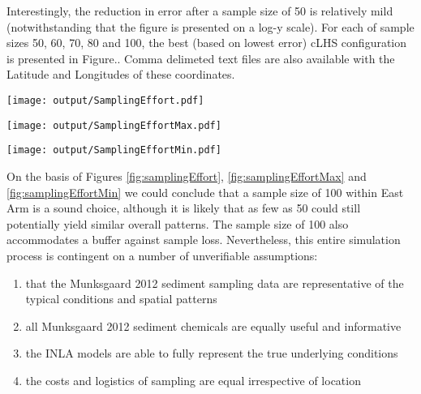 \documentclass[a4paper]{article}
\let\origfigure=\figure
\let\endorigfigure=\endfigure
\renewenvironment{figure}[1][]{%
   \origfigure[H]
}{%
   \endorigfigure
}
\begin{document}
Interestingly, the reduction in error after a sample size of 50 is
relatively mild (notwithstanding that the figure is presented on a log-y
scale). For each of sample sizes 50, 60, 70, 80 and 100, the best (based
on lowest error) cLHS configuration is presented in Figure.. Comma
delimeted text files are also available with the Latitude and Longitudes
of these coordinates.

\begin{figure}
\centering\scriptsize
\texttt{[image: output/SamplingEffort.pdf]}
\caption{Comparison of the mean Error conditional on sample size and
sampling method for the East Arm\label{fig:samplingEffort}}
\end{figure}

\begin{figure}
\centering\scriptsize
\texttt{[image: output/SamplingEffortMax.pdf]}
\caption{Comparison of the maximum Error conditional on sample size and
sampling method for the East Arm\label{fig:samplingEffortMax}}
\end{figure}

\begin{figure}
\centering\scriptsize
\texttt{[image: output/SamplingEffortMin.pdf]}
\caption{Comparison of the minimum Error conditional on sample size and
sampling method for the East Arm\label{fig:samplingEffortMin}}
\end{figure}

On the basis of Figures \ref{fig:samplingEffort},
\ref{fig:samplingEffortMax} and \ref{fig:samplingEffortMin} we could
conclude that a sample size of 100 within East Arm is a sound choice,
although it is likely that as few as 50 could still potentially yield
similar overall patterns. The sample size of 100 also accommodates a
buffer against sample loss. Nevertheless, this entire simulation process
is contingent on a number of unverifiable assumptions:

\begin{enumerate}
\def\labelenumi{\arabic{enumi}.}
\tightlist
\item
  that the Munksgaard 2012 sediment sampling data are representative of
  the typical conditions and spatial patterns
\item
  all Munksgaard 2012 sediment chemicals are equally useful and
  informative
\item
  the INLA models are able to fully represent the true underlying
  conditions
\item
  the costs and logistics of sampling are equal irrespective of location
\end{enumerate}
\end{document}
